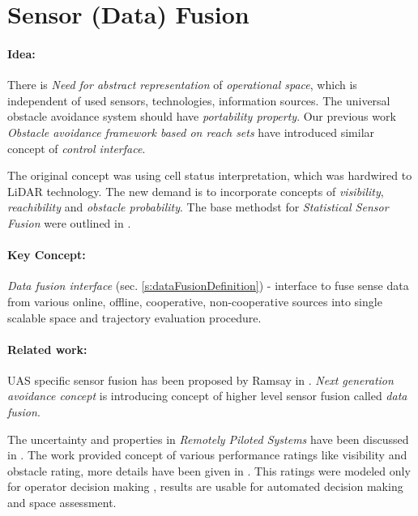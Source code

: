 \section{Sensor (Data) Fusion}\label{s:dataFusionProbabilisticModelTheory}
\paragraph{Idea:}  There is \emph{Need for abstract representation} of \emph{operational space}, which is independent of used sensors, technologies, information sources. The universal obstacle avoidance system should have \emph{portability property}. Our previous work \emph{Obstacle avoidance framework based on reach sets} \cite{gomola2017obstacle} have introduced similar concept of \emph{control interface}.

The original concept was using cell status interpretation, which was hardwired to LiDAR technology.  The new demand is to incorporate concepts of \emph{visibility}, \emph{reachibility} and \emph{obstacle probability}. The base methodst for \emph{Statistical Sensor Fusion} were outlined in \cite{gustafsson2010statistical}.

\paragraph{Key Concept:} \emph{Data fusion interface} (sec. \ref{s:dataFusionDefinition}) - interface to fuse sense data from various online, offline, cooperative, non-cooperative sources into single scalable {space and trajectory evaluation procedure}.
    
\paragraph{Related work:} \noindent UAS specific sensor fusion has been proposed by Ramsay in \cite{ramasamy2014avionics}. \emph{Next generation avoidance concept} \cite{ramasamy2014next} is introducing concept of higher level sensor fusion called \emph{data fusion}. 

The uncertainty and properties in \emph{Remotely Piloted Systems} have been discussed in \cite{chynchenko2016remotely}. The work provided concept of various performance ratings like visibility and obstacle rating, more details have been given in \cite{shmelova2016modeling}. This ratings were modeled only for operator decision making \cite{kharchenko2017modelling}, results are usable for automated decision making and space assessment. 

